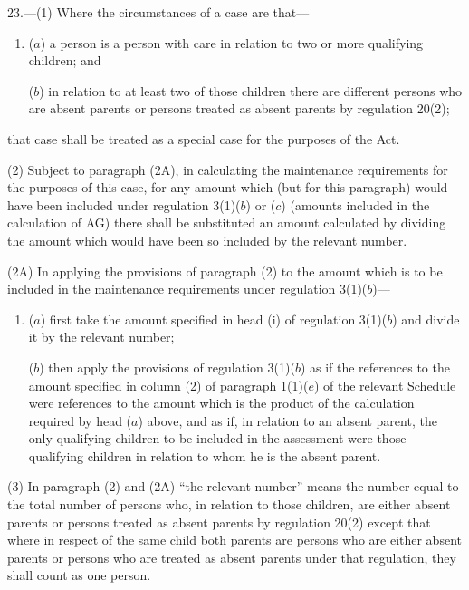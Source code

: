 \documentclass[12pt,a4paper]{article}
\begin{document}
23.—(1) Where the circumstances of a case are that—
\begin{enumerate}\item[]
($a$) a person is a person with care in relation to two or more qualifying children; and

($b$) in relation to at least two of those children there are different persons who are absent parents or persons treated as absent parents by regulation 20(2);
\end{enumerate}
that case shall be treated as a special case for the purposes of the Act.

(2) 
Subject to paragraph (2A), %
in calculating the maintenance requirements for the purposes of this case, for any amount which (but for this paragraph) would have been included under regulation 3(1)($b$)
or ($c$)  %
(amounts included in the calculation of AG) there shall be substituted an amount calculated by dividing the amount which would have been so included by the relevant number.

(2A) In applying the provisions of paragraph (2) to the amount which is to be included in the maintenance requirements under regulation 3(1)($b$)—
\begin{enumerate}\item[]
($a$) first take the amount specified in head (i) of regulation 3(1)($b$) and divide it by the relevant number;

($b$) then apply the provisions of regulation 3(1)($b$) as if the references to the amount specified in column (2) of paragraph 1(1)($e$) of the relevant Schedule were references to the amount which is the product of the calculation required by head ($a$) above, and as if, in relation to an absent parent, the only qualifying children to be included in the assessment were those qualifying children in relation to whom he is the absent parent.
\end{enumerate}

(3) 
In paragraph (2) and (2A) %
“the relevant number” means the number equal to the total number of persons who, in relation to those children, are either absent parents or persons treated as absent parents by regulation 20(2) except that where in respect of the same child both parents are persons who are either absent parents or persons who are treated as absent parents under that regulation, they shall count as one person.
\end{document}
